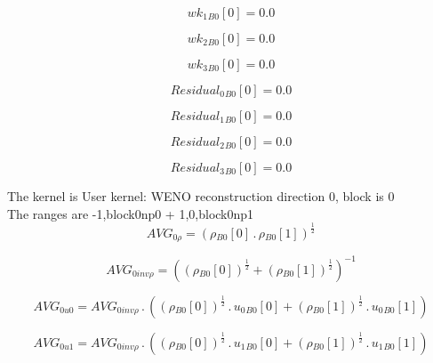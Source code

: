 \documentclass{article}
\begin{document}
\begin{dmath}{wk_{1}{_{B0}}}[{0}] = 0.0\end{dmath}

\begin{dmath}{wk_{2}{_{B0}}}[{0}] = 0.0\end{dmath}

\begin{dmath}{wk_{3}{_{B0}}}[{0}] = 0.0\end{dmath}

\begin{dmath}{Residual_{0}{_{B0}}}[{0}] = 0.0\end{dmath}

\begin{dmath}{Residual_{1}{_{B0}}}[{0}] = 0.0\end{dmath}

\begin{dmath}{Residual_{2}{_{B0}}}[{0}] = 0.0\end{dmath}

\begin{dmath}{Residual_{3}{_{B0}}}[{0}] = 0.0\end{dmath}

\noindent The kernel is User kernel: WENO reconstruction direction 0, block is 0\\\noindent The ranges are -1,block0np0 + 1,0,block0np1\\\begin{dmath}AVG_{0 \rho} = \left({\rho{_{B0}}}[{0}] \,.\, {\rho{_{B0}}}[{1}] \right)^{\frac{1}{2}}\end{dmath}

\begin{dmath}AVG_{0 inv \rho} = \left(\left({\rho{_{B0}}}[{0}] \right)^{\frac{1}{2}} + \left({\rho{_{B0}}}[{1}] \right)^{\frac{1}{2}} \right)^{-1}\end{dmath}

\begin{dmath}AVG_{0 u0} = AVG_{0 inv \rho} \,.\, \left(\left({\rho{_{B0}}}[{0}] \right)^{\frac{1}{2}} \,.\, {u_{0}{_{B0}}}[{0}] + \left({\rho{_{B0}}}[{1}] \right)^{\frac{1}{2}} \,.\, {u_{0}{_{B0}}}[{1}]\right)\end{dmath}

\begin{dmath}AVG_{0 u1} = AVG_{0 inv \rho} \,.\, \left(\left({\rho{_{B0}}}[{0}] \right)^{\frac{1}{2}} \,.\, {u_{1}{_{B0}}}[{0}] + \left({\rho{_{B0}}}[{1}] \right)^{\frac{1}{2}} \,.\, {u_{1}{_{B0}}}[{1}]\right)\end{dmath}
\end{document}
